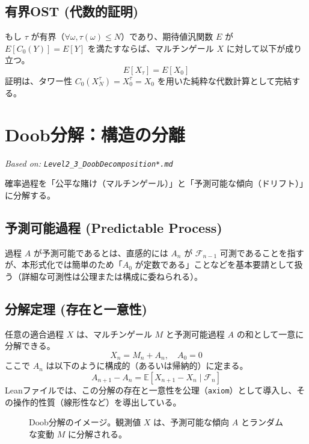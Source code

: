 \documentclass[a4paper,11pt]{ltjsarticle}
\theoremstyle{definition}
\newcommand{\F}{\mathcal{F}}
\newcommand{\Expect}{\mathbb{E}}
\newcommand{\CondExp}[2]{\Expect[#1 \mid #2]}
\newcommand{\Tau}{\tau}
\begin{document}
\subsection{有界OST (代数的証明)}
もし $\Tau$ が有界（$\forall \omega, \Tau(\omega) \le N$）であり、期待値汎関数 $E$ が $E[C_0(Y)] = E[Y]$ を満たすならば、マルチンゲール $X$ に対して以下が成り立つ。
\[ E[X_\Tau] = E[X_0] \]
証明は、タワー性 $C_0(X^\Tau_N) = X^\Tau_0 = X_0$ を用いた純粋な代数計算として完結する。

\section{Doob分解：構造の分離}
\label{sec:doob}
\textit{Based on: \texttt{Level2\_3\_DoobDecomposition*.md}}

確率過程を「公平な賭け（マルチンゲール）」と「予測可能な傾向（ドリフト）」に分解する。

\subsection{予測可能過程 (Predictable Process)}
過程 $A$ が予測可能であるとは、直感的には $A_n$ が $\F_{n-1}$ 可測であることを指すが、本形式化では簡単のため「$A_0$ が定数である」ことなどを基本要請として扱う（詳細な可測性は公理または構成に委ねられる）。

\subsection{分解定理 (存在と一意性)}
任意の適合過程 $X$ は、マルチンゲール $M$ と予測可能過程 $A$ の和として一意に分解できる。
\[ X_n = M_n + A_n, \quad A_0 = 0 \]
ここで $A_n$ は以下のように構成的（あるいは帰納的）に定まる。
\[ A_{n+1} - A_n = \CondExp{X_{n+1} - X_n}{\F_n} \]
Leanファイルでは、この分解の存在と一意性を公理（\texttt{axiom}）として導入し、その操作的性質（線形性など）を導出している。

\begin{figure}[h]
\centering
{}
\caption{Doob分解のイメージ。観測値 $X$ は、予測可能な傾向 $A$ とランダムな変動 $M$ に分解される。}
\end{figure}
\end{document}
